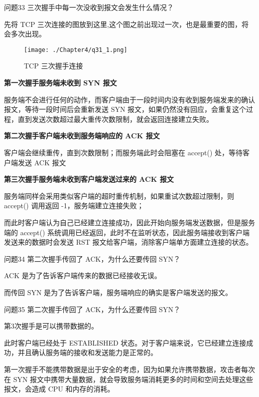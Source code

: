 \documentclass[cn,11pt,color=blue,lang=cn]{elegantbook}
\begin{document}
\begin{custom}{问题33}
三次握手中每一次没收到报文会发生什么情况？
\end{custom}

\begin{solution}
先将 TCP 三次连接的图放到这里,这个图之前出现过一次，也是最重要的图，将会多次出现。
\begin{figure}[htbp]
\centering
\texttt{[image: ./Chapter4/q31\_1.png]}
\caption{TCP 三次握手连接}
\end{figure}
\end{solution}

\begin{note} \textbf{第一次握手服务端未收到 SYN 报文} \end{note}
 服务端不会进行任何的动作，而客户端由于一段时间内没有收到服务端发来的确认报文，等待一段时间后会重新发送 SYN 报文，如果仍然没有回应，会重复这个过程，直到发送次数超过最大重传次数限制，就会返回连接建立失败。

\begin{note} \textbf{第二次握手客户端未收到服务端响应的 ACK 报文} \end{note}
客户端会继续重传，直到次数限制；而服务端此时会阻塞在 accept() 处，等待客户端发送 ACK 报文

\begin{note} \textbf{第三次握手服务端未收到客户端发送过来的 ACK 报文} \end{note}
服务端同样会采用类似客户端的超时重传机制，如果重试次数超过限制，则 accept() 调用返回 -1，服务端建立连接失败；

而此时客户端认为自己已经建立连接成功，因此开始向服务端发送数据，但是服务端的 accept() 系统调用已经返回，此时不在监听状态，因此服务端接收到客户端发送来的数据时会发送 RST 报文给客户端，消除客户端单方面建立连接的状态。


\begin{custom}{问题34}
第二次握手传回了 ACK，为什么还要传回 SYN？
\end{custom}
\begin{solution}
ACK 是为了告诉客户端传来的数据已经接收无误。

而传回 SYN 是为了告诉客户端，服务端响应的确实是客户端发送的报文。
\end{solution}

\begin{custom}{问题35}
第二次握手传回了 ACK，为什么还要传回 SYN？
\end{custom}
\begin{solution}
第3次握手是可以携带数据的。

此时客户端已经处于 ESTABLISHED 状态。对于客户端来说，它已经建立连接成功，并且确认服务端的接收和发送能力是正常的。

第一次握手不能携带数据是出于安全的考虑，因为如果允许携带数据，攻击者每次在 SYN 报文中携带大量数据，就会导致服务端消耗更多的时间和空间去处理这些报文，会造成 CPU 和内存的消耗。
\end{solution}
\end{document}
